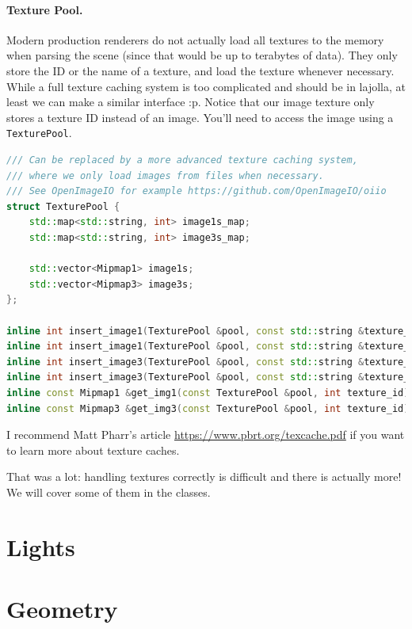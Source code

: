 \documentclass{article}
\begin{document}
\paragraph{Texture Pool.} Modern production renderers do not actually load all textures to the memory when parsing
the scene (since that would be up to terabytes of data). They only store the ID or the name of a texture, and load the texture whenever necessary. While a full texture caching system is too complicated and should be in lajolla, at least we can make a similar interface :p. Notice that our image texture only stores a texture ID instead of an image. You'll need to access the image using a \lstinline{TexturePool}.
\begin{lstlisting}[language=c++]
/// Can be replaced by a more advanced texture caching system,
/// where we only load images from files when necessary.
/// See OpenImageIO for example https://github.com/OpenImageIO/oiio
struct TexturePool {
    std::map<std::string, int> image1s_map;
    std::map<std::string, int> image3s_map;

    std::vector<Mipmap1> image1s;
    std::vector<Mipmap3> image3s;
};

inline int insert_image1(TexturePool &pool, const std::string &texture_name, const fs::path &filename);
inline int insert_image1(TexturePool &pool, const std::string &texture_name, const Image1 &img);
inline int insert_image3(TexturePool &pool, const std::string &texture_name, const fs::path &filename);
inline int insert_image3(TexturePool &pool, const std::string &texture_name, const Image3 &img);
inline const Mipmap1 &get_img1(const TexturePool &pool, int texture_id);
inline const Mipmap3 &get_img3(const TexturePool &pool, int texture_id);
\end{lstlisting}

I recommend Matt Pharr's article \href{The Implementation of a Scalable Texture Cache}{https://www.pbrt.org/texcache.pdf} if you want to learn more about texture caches.

That was a lot: handling textures correctly is difficult and there is actually more! We will cover some of them in the classes.

\section{Lights}

\section{Geometry}
\end{document}
